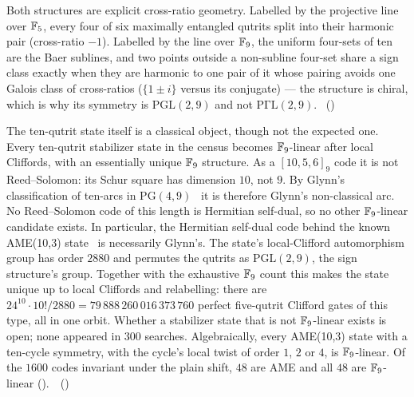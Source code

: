 Both structures are explicit cross-ratio geometry. Labelled by the projective line over $\mathbb{F}_5$, every four of six
maximally entangled qutrits split into their harmonic pair (cross-ratio $-1$). Labelled by the line over $\mathbb{F}_9$, the
uniform four-sets of ten are the Baer sublines, and two points outside a non-subline four-set share a sign class exactly
when they are harmonic to one pair of it whose pairing avoids one Galois class of cross-ratios ($\{1\pm i\}$ versus
its conjugate) --- the structure is chiral, which is why its symmetry is $\mathrm{PGL}(2,9)$ and not
$\mathrm{P\Gamma L}(2,9)$. \tierC\ ()

The ten-qutrit state itself is a classical object, though not the expected one. Every ten-qutrit stabilizer state in
the census becomes $\mathbb{F}_9$-linear after local Cliffords, with an essentially unique $\mathbb{F}_9$ structure. As a $[10,5,6]_9$
code it is not Reed--Solomon: its Schur square has dimension $10$, not $9$. By Glynn's classification of ten-arcs in
$\mathrm{PG}(4,9)$~\cite{Glynn1986} it is therefore Glynn's non-classical arc. No Reed--Solomon code of this length is
Hermitian self-dual, so no other $\mathbb{F}_9$-linear candidate exists. In particular, the Hermitian self-dual code behind
the known AME(10,3) state~\cite{GrasslGulliver2009,GrasslRoetteler2015} is necessarily Glynn's. The state's local-Clifford automorphism group has order
$2880$ and permutes the qutrits as $\mathrm{PGL}(2,9)$, the sign structure's group. Together with the exhaustive $\mathbb{F}_9$
count this makes the state unique up to local Cliffords and relabelling: there are $24^{10}\cdot10!/2880 =
79\,888\,260\,016\,373\,760$ perfect five-qutrit Clifford gates of this type, all in one orbit. Whether a stabilizer
state that is not $\mathbb{F}_9$-linear exists is open; none appeared in $300$ searches. Algebraically, every AME(10,3) state with a ten-cycle symmetry, with the cycle's local twist of order $1$, $2$ or $4$, is $\mathbb{F}_9$-linear. Of the $1600$ codes invariant under the plain shift, $48$ are AME and all $48$ are $\mathbb{F}_9$-linear (). \tierT\,\tierC\
()

